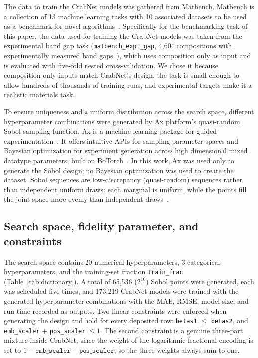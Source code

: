 \documentclass[pdflatex,sn-mathphys-num]{sn-jnl}
\begin{document}
The data to train the CrabNet models was gathered from Matbench. Matbench is a collection of 13 machine learning tasks with 10 associated datasets to be used as a benchmark for novel algorithms~\cite{Existing10_Dunn2020_Matbench}. Specifically for the benchmarking task of this paper, the data used for training the CrabNet models was taken from the experimental band gap task (\texttt{matbench\_expt\_gap}, 4,604 compositions with experimentally measured band gaps~\cite{Zhuo2018_BandGapML}), which uses composition only as input and is evaluated with five-fold nested cross-validation. We chose it because composition-only inputs match CrabNet's design, the task is small enough to allow hundreds of thousands of training runs, and experimental targets make it a realistic materials task.

To ensure uniqueness and a uniform distribution across the search space, different hyperparameter combinations were generated by Ax platform's quasi-random Sobol sampling function. Ax is a machine learning package for guided experimentation~\cite{Olson2025_Ax}. It offers intuitive APIs for sampling parameter spaces and Bayesian optimization for experiment generation across high dimensional mixed datatype parameters, built on BoTorch~\cite{Balandat2020_BoTorch}. In this work, Ax was used only to generate the Sobol design; no Bayesian optimization was used to create the dataset. Sobol sequences are low-discrepancy (quasi-random) sequences rather than independent uniform draws: each marginal is uniform, while the points fill the joint space more evenly than independent draws~\cite{Sobol1967_Sobol}.

\subsection{Search space, fidelity parameter, and constraints}\label{sec:methods-search-space}

The search space contains 20 numerical hyperparameters, 3 categorical hyperparameters, and the training-set fraction \texttt{train\_frac} (Table~\ref{tab:dictionary}). A total of 65,536 ($2^{16}$) Sobol points were generated, each was scheduled five times, and 173,219 CrabNet models were trained with the generated hyperparameter combinations with the MAE, RMSE, model size, and run time recorded as outputs. Two linear constraints were enforced when generating the design and hold for every deposited row: \texttt{betas1} $\le$ \texttt{betas2}, and \texttt{emb\_scaler} + \texttt{pos\_scaler} $\le 1$. The second constraint is a genuine three-part mixture inside CrabNet, since the weight of the logarithmic fractional encoding is set to $1 - \texttt{emb\_scaler} - \texttt{pos\_scaler}$, so the three weights always sum to one.
\end{document}
